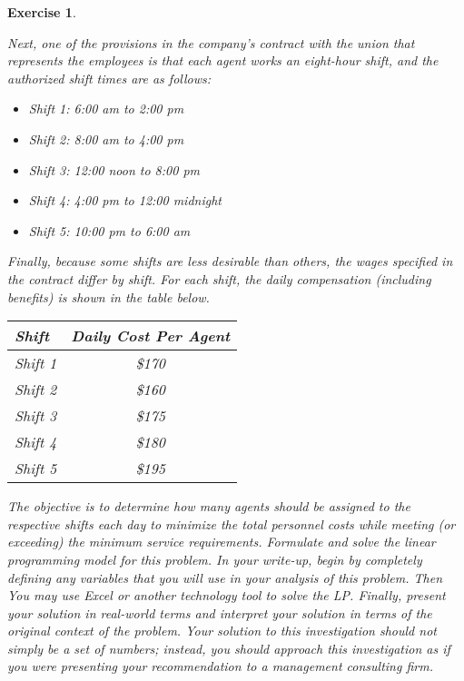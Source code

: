 \documentclass[letterpaper,10pt]{article}
\newtheorem{ex}{Exercise}
\begin{document}
\begin{ex}
\begin{center}
\end{center}


Next, one of the provisions in the company's contract with the union that represents the employees is that each agent works an eight-hour shift, and the authorized shift times are as follows:

\begin{itemize}

\item Shift 1: 6:00 am to 2:00 pm

\item Shift 2: 8:00 am to 4:00 pm

\item Shift 3: 12:00 noon to 8:00 pm

\item Shift 4: 4:00 pm to 12:00 midnight

\item Shift 5: 10:00 pm to 6:00 am

\end{itemize}

Finally, because some shifts are less desirable than others, the wages specified in the contract differ by shift.  For each shift, the daily compensation (including benefits) is shown in the table below.

\begin{center}

\begin{tabular}{|l|c|}\hline
{\bf Shift }&{\bf Daily Cost Per Agent}\\\hline\hline
Shift 1 & \$170\\\hline
Shift 2 & \$160\\\hline
Shift 3 & \$175\\\hline
Shift 4 & \$180\\\hline
Shift 5 & \$195\\\hline
\end{tabular}

\end{center}

The objective is to determine how many agents should be assigned to the respective shifts each day to minimize the total personnel costs while meeting (or exceeding) the minimum service requirements.  Formulate and solve the linear programming model for this problem.  In your write-up, begin by completely defining any variables that you will use in your analysis of this problem.  Then You may use Excel or another technology tool to solve the LP. Finally, present your solution in real-world terms and interpret your solution in terms of the original context of the problem. Your solution to this investigation should not simply be a set of numbers; instead, you should approach this investigation as if you were presenting your recommendation to a management consulting firm. 


\end{ex}
\end{document}
